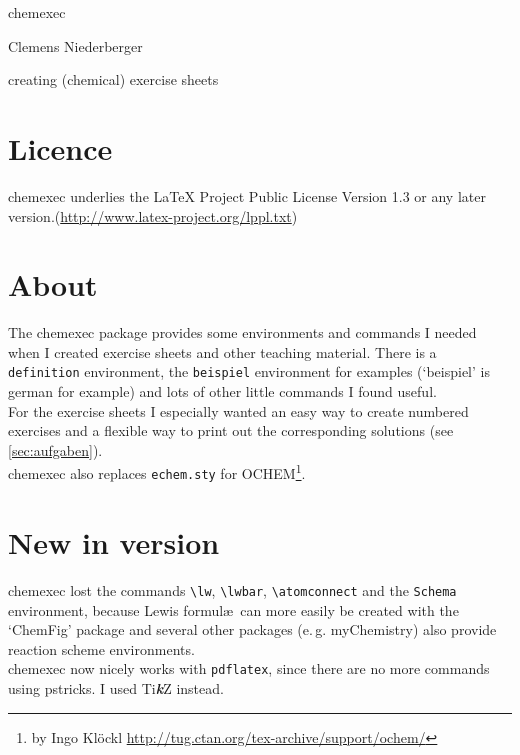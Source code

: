 \documentclass[DIV10]{scrartcl}
\newcommand{\TikZ}{\mbox{Ti{\bfseries\itshape k}Z}\xspace}
\newcommand{\eg}{\mbox{e.\,g.}\xspace}
\newcommand{\CEx}[1][8]{%
{\color{dunkelrot}\fontfamily{pag}\fontsize{#1}{#1}\selectfont chemexec}\xspace
}
\let\saveversion\CEversion
\def\CEversion{\saveversion\xspace}
\begin{document}
\begin{titlepage}
  \begin{center}
    \vspace*{-1.5cm}
    \CEx[45]\par
    \Large\CEversion\par\bigskip
    \footnotesize{}\par
    \normalsize Clemens Niederberger\par\vskip1.5cm
    \color{white}\huge creating (chemical) exercise sheets%
  \end{center}
  \vskip3cm
  
\end{titlepage}

\tableofcontents

\section{Licence}
\CEx \CEversion underlies the LaTeX Project Public License Version 1.3 or any later version.\newline(\url{http://www.latex-project.org/lppl.txt})

\section{About}
The \CEx package provides some environments and commands I needed when I created exercise sheets and other teaching material. There is a \verb=definition= environment, the \verb=beispiel= environment for examples (`beispiel' is german for example) and lots of other little commands I found useful.\\
For the exercise sheets I especially wanted an easy way to create numbered exercises and a flexible way to print out the corresponding solutions (see \ref{sec:aufgaben}).\\
\CEx also replaces \verb=echem.sty= for OCHEM\footnote{by Ingo Kl\"ockl \url{http://tug.ctan.org/tex-archive/support/ochem/}}.

\section{New in version \CEversion}
\CEx lost the commands \verb=\lw=, \verb=\lwbar=, \verb=\atomconnect= and the \verb=Schema= environment, because Lewis formul\ae\ can more easily be created with the `ChemFig' package and several other packages (\eg myChemistry) also provide reaction scheme environments.\\
\CEx now nicely works with \verb=pdflatex=, since there are no more commands using pstricks. I used \TikZ instead.
\end{document}
